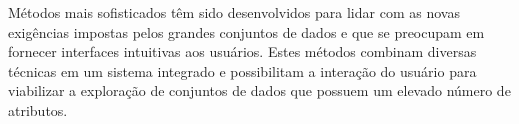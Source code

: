 Métodos mais sofisticados têm sido desenvolvidos para lidar com as novas exigências impostas pelos grandes conjuntos de dados e que se preocupam em fornecer interfaces intuitivas aos usuários. Estes métodos combinam diversas técnicas em um sistema integrado e possibilitam a interação do usuário para viabilizar a exploração de conjuntos de dados que possuem um elevado número de atributos.
